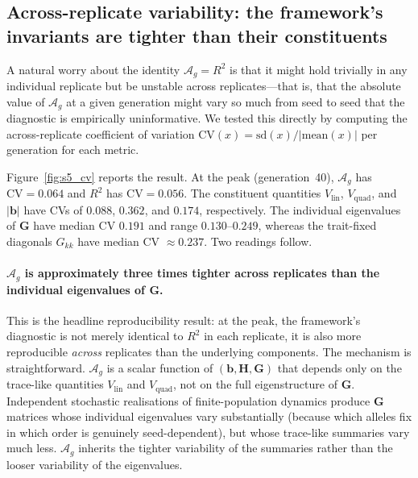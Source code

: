 \documentclass[9pt,twocolumn,twoside,lineno]{gsajnl}
\newcommand{\vect}[1]{\boldsymbol{#1}}
\newcommand{\mat}[1]{\mathbf{#1}}
\newcommand{\Ag}{\ensuremath{\mathcal{A}_{g}}\xspace}
\newcommand{\Vlin}{\ensuremath{V_{\text{lin}}}\xspace}
\newcommand{\Vquad}{\ensuremath{V_{\text{quad}}}\xspace}
\begin{document}
\subsection*{Across-replicate variability: the framework's invariants are tighter than their constituents}

A natural worry about the identity \mbox{$\Ag = R^2$} is that it might hold trivially in any individual replicate but be unstable across replicates---that is, that the absolute value of \Ag at a given generation might vary so much from seed to seed that the diagnostic is empirically uninformative. We tested this directly by computing the across-replicate coefficient of variation \mbox{$\mathrm{CV}(x) = \mathrm{sd}(x)/|\mathrm{mean}(x)|$} per generation for each metric.

Figure~\ref{fig:s5_cv} reports the result. At the peak (generation~40), \Ag has \mbox{$\mathrm{CV}=0.064$} and $R^2$ has \mbox{$\mathrm{CV}=0.056$}. The constituent quantities $\Vlin$, $\Vquad$, and $|\vect{b}|$ have CVs of $0.088$, $0.362$, and $0.174$, respectively. The individual eigenvalues of $\mat{G}$ have median CV $0.191$ and range $0.130$--$0.249$, whereas the trait-fixed diagonals $G_{kk}$ have median CV $\approx 0.237$. Two readings follow.

\paragraph{\Ag is approximately three times tighter across replicates than the individual eigenvalues of \texorpdfstring{$\mat{G}$}{G}.} 
This is the headline reproducibility result: at the peak, the framework's diagnostic is not merely identical to $R^2$ in each replicate, it is also more reproducible \emph{across} replicates than the underlying components. The mechanism is straightforward. \Ag is a scalar function of \mbox{$(\vect{b},\mat{H},\mat{G})$} that depends only on the trace-like quantities $\Vlin$ and $\Vquad$, not on the full eigenstructure of $\mat{G}$. Independent stochastic realisations of finite-population dynamics produce $\mat{G}$ matrices whose individual eigenvalues vary substantially (because which alleles fix in which order is genuinely seed-dependent), but whose trace-like summaries vary much less. \Ag inherits the tighter variability of the summaries rather than the looser variability of the eigenvalues.
\end{document}

